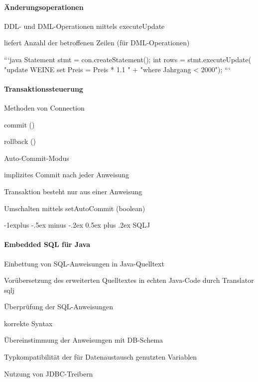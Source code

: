 \documentclass[a4paper]{article}
\makeatletter
\renewcommand{\subsection}{\@startsection{subsection}{2}{0mm}%
                                {-1explus -.5ex minus -.2ex}%
                                {0.5ex plus .2ex}%
                                {\normalfont\normalsize\bfseries}}
\makeatother
\begin{document}
\begin{multicols}{3}
\paragraph{Änderungsoperationen}
\begin{itemize*}
    \item DDL- und DML-Operationen mittels executeUpdate
    \item liefert Anzahl der betroffenen Zeilen (für DML-Operationen)
\end{itemize*}
```java
Statement stmt = con.createStatement();
int rows = stmt.executeUpdate(
"update WEINE set Preis = Preis * 1.1 " +
"where Jahrgang < 2000");
```

\paragraph{Transaktionssteuerung}
\begin{itemize*}
    \item Methoden von Connection
    \begin{itemize*}
        \item commit ()
        \item rollback ()
    \end{itemize*}
    \item Auto-Commit-Modus
    \begin{itemize*}
        \item implizites Commit nach jeder Anweisung
        \item Transaktion besteht nur aus einer Anweisung
        \item Umschalten mittels setAutoCommit (boolean)
    \end{itemize*}
\end{itemize*}

\subsection{SQLJ}
\paragraph{Embedded SQL für Java}
\begin{itemize*}
    \item Einbettung von SQL-Anweisungen in Java-Quelltext
    \item Vorübersetzung des erweiterten Quelltextes in echten Java-Code durch Translator sqlj
    \item Überprüfung der SQL-Anweisungen
    \begin{itemize*}
        \item korrekte Syntax
        \item Übereinstimmung der Anweisungen mit DB-Schema
        \item Typkompatibilität der für Datenaustausch genutzten Variablen
    \end{itemize*}
    \item Nutzung von JDBC-Treibern
\end{itemize*}


\end{multicols}
\end{document}

